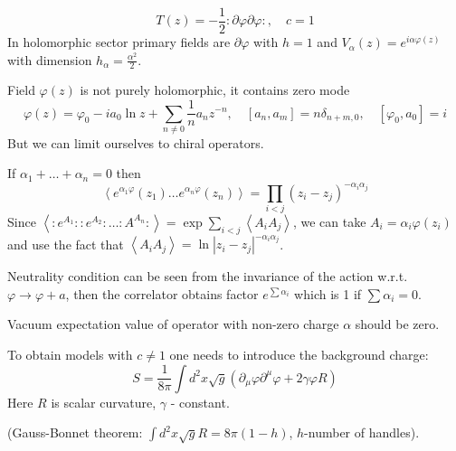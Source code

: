 \documentclass[12pt]{article}
\begin{document}
\begin{equation}
  \label{eq:42}
  T(z)=-\frac{1}{2}:\partial \varphi \partial \varphi:, \quad c=1
\end{equation}
In holomorphic sector primary fields are $\partial \varphi$ with $h=1$ and
$V_{\alpha}(z)=e^{i \alpha \varphi(z)}$ with dimension $h_{\alpha}=\frac{\alpha^{2}}{2}$.

Field $\varphi(z)$ is not purely holomorphic, it contains zero mode
\begin{equation}
  \label{eq:43}
  \varphi(z)=\varphi_{0}-ia_{0}\ln z+\sum_{n\neq 0}\frac{1}{n}a_{n} z^{-n},\quad
  [a_{n},a_{m}]=n\delta_{n+m,0}, \quad [\varphi_{0},a_{0}]=i
\end{equation}
But we can limit ourselves to chiral operators.

If $\alpha_{1}+\dots+\alpha_{n}=0$ then 
\begin{equation}
  \label{eq:41}
  \left<e^{\alpha_{1}\varphi}(z_{1})\dots e^{\alpha_{n}\varphi}(z_{n})\right> = \prod_{i<j}(z_{i}-z_{j})^{-\alpha_{i}\alpha_{j}}
\end{equation}
Since $\left< :e^{A_{1}}::e^{A_{2}}:\dots :A^{A_{n}}:\right> =
\exp\sum_{i<j}\left<A_{i}A_{j}\right>$, we can take $A_{i}=\alpha_{i}\varphi(z_{i})$ and use the
fact that $\left<A_{i}A_{j}\right>=\ln |z_{i}-z_{j}|^{-\alpha_{i}\alpha_{j}}$. 

Neutrality condition can be seen from the invariance of the action w.r.t. $\varphi\to\varphi+a$,
then the correlator obtains factor $e^{\sum \alpha_{i}}$ which is 1 if $\sum \alpha_{i}=0$.

Vacuum expectation value of operator with non-zero charge $\alpha$ should be zero. 

To obtain models with $c\neq 1$ one needs to introduce the background charge:
\begin{equation}
  \label{eq:44}
  S=\frac{1}{8\pi} \int d^{2}x \sqrt{g} (\partial_{\mu}\varphi\partial^{\mu}\varphi+2\gamma\varphi R)
\end{equation}
Here $R$ is scalar curvature, $\gamma$ - constant. 

(Gauss-Bonnet theorem: $\int d^{2}x \sqrt{g} R = 8\pi(1-h)$, $h$-number of handles).
\end{document}
